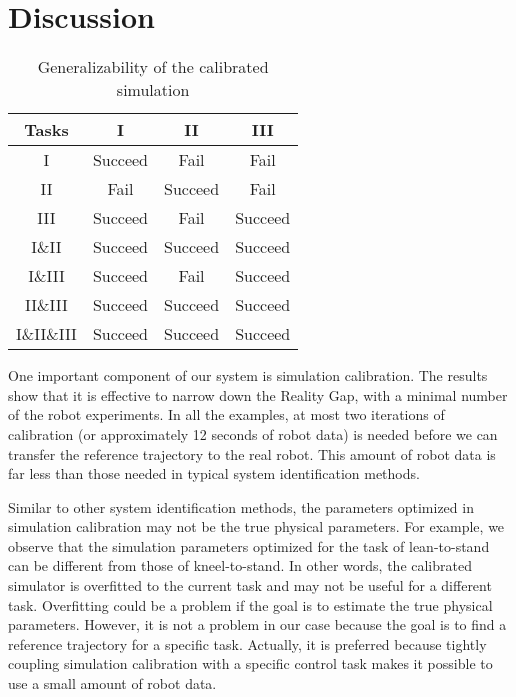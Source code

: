 \section{Discussion}
\begin{table}
  \caption{Generalizability of the calibrated simulation}
  \vspace{-0.1in}
 \label{table:generalize}
\begin{center}
\begin{tabular}{|c|c|c|c|}
\hline
 Tasks &  I &  II  &  III \\
 \hline
 I & Succeed & Fail & Fail  \\
 II & Fail & Succeed & Fail \\
 III & Succeed & Fail & Succeed \\
 I\&II & Succeed & Succeed & Succeed\\
 I\&III & Succeed & Fail & Succeed\\
 II\&III & Succeed & Succeed & Succeed \\
 I\&II\&III & Succeed & Succeed & Succeed\\
\hline
\end{tabular}
\vspace{-0.2in}
\end{center}
 \end{table}


One important component of our system is simulation calibration. The results show that it is effective to narrow down the Reality Gap, with a minimal number of the robot experiments. In all the examples, at most two iterations of calibration (or approximately 12 seconds of robot data) is needed before we can transfer the reference trajectory to the real robot. This amount of robot data is far less than those needed in typical system identification methods.

Similar to other system identification methods, the parameters optimized in simulation calibration may not be the true physical parameters. For example, we observe that the simulation parameters optimized for the task of lean-to-stand can be different from those of kneel-to-stand. In other words, the calibrated simulator is overfitted to the current task and may not be useful for a different task. Overfitting could be a problem if the goal is to estimate the true physical parameters. However, it is not a problem in our case because the goal is to find a reference trajectory for a specific task. Actually, it is preferred because tightly coupling simulation calibration with a specific control task makes it possible to use a small amount of robot data.

